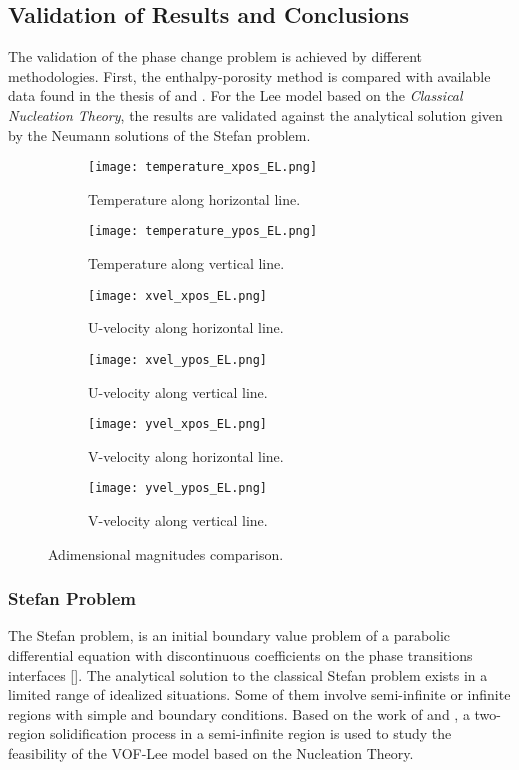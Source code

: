 \subsection{Validation of Results and Conclusions}
The validation of the phase change problem is achieved by different methodologies. First, the enthalpy-porosity method is compared with available data found in the thesis of \cite{bourdillon_2016} and \cite{kowalewski_rebow_1999}. For the Lee model based on the \textit{Classical Nucleation Theory}, the results are validated against the analytical solution given by the Neumann solutions of the Stefan problem.
\begin{figure}[h!]
	\begin{subfigure}{0.50\textwidth}
		\centering
		\texttt{[image: temperature\_xpos\_EL.png]}\hfill
		\caption{Temperature along horizontal line.} \label{3.5a}
	\end{subfigure}
	\hfill
	\begin{subfigure}{0.50\textwidth}
		\centering
		\texttt{[image: temperature\_ypos\_EL.png]}	
		\caption{Temperature along vertical line.}\label{3.5b}
	\end{subfigure}
	\begin{subfigure}{0.50\textwidth}
		\texttt{[image: xvel\_xpos\_EL.png]}\hfill
		\caption{U-velocity along horizontal line.}\label{3.5c}
	\end{subfigure}
	\begin{subfigure}{0.50\textwidth}
		\texttt{[image: xvel\_ypos\_EL.png]}	
		\caption{U-velocity along vertical line.}\label{3.5d}
	\end{subfigure}
	\begin{subfigure}{0.50\textwidth}
		\texttt{[image: yvel\_xpos\_EL.png]}\hfill	
		\caption{V-velocity along horizontal line.}\label{3.5e}
	\end{subfigure}
	\begin{subfigure}{0.50\textwidth}
		\texttt{[image: yvel\_ypos\_EL.png]}	
		\caption{V-velocity along vertical line.}\label{3.5f}
	\end{subfigure}
	\caption{Adimensional magnitudes comparison.}
	\label{3.5}
\end{figure}

\subsubsection{Stefan Problem}
The Stefan problem, is an initial boundary value problem of a parabolic differential equation with discontinuous coefficients on the phase transitions interfaces [\cite{vasilyev_vasilyeva_2020}]. The analytical solution to the classical Stefan problem exists in a limited range of idealized situations. Some of them involve semi-infinite or infinite regions with simple and boundary conditions. Based on the work of \cite{vasilyev_vasilyeva_2020} and \cite{zhao_zhao_xu_2018}, a two-region solidification process in a semi-infinite region is used to study the feasibility of the VOF-Lee model based on the Nucleation Theory.
